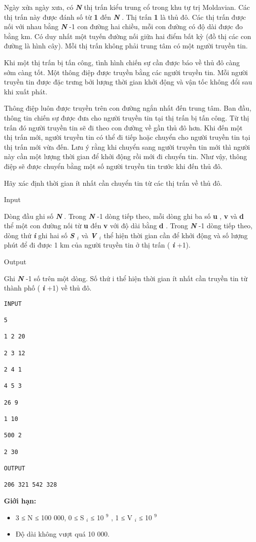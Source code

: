 

Ngày xửa ngày xưa, có \textbf{\emph{ N }} thị trấn kiểu trung cổ trong khu tự trị Moldavian. Các thị trấn này được đánh số từ \textbf{ 1 } đến \textbf{\emph{ N }} . Thị trấn \textbf{ 1 } là thủ đô. Các thị trấn được nối với nhau bằng \textbf{\emph{ N }} -1 con đường hai chiều, mỗi con đường có độ dài được đo bằng km. Có duy nhất một tuyến đường nối giữa hai điểm bất kỳ (đồ thị các con đường là hình cây). Mỗi thị trấn không phải trung tâm có một người truyền tin.

Khi một thị trấn bị tấn công, tình hình chiến sự cần được báo về thủ đô càng sớm càng tốt. Một thông điệp được truyền bằng các người truyền tin. Mỗi người truyền tin được đặc trưng bởi lượng thời gian khởi động và vận tốc không đổi sau khi xuất phát.

Thông điệp luôn được truyền trên con đường ngắn nhất đến trung tâm. Ban đầu, thông tin chiến sự được đưa cho người truyền tin tại thị trấn bị tấn công. Từ thị trấn đó người truyền tin sẽ đi theo con đường về gần thủ đô hơn. Khi đến một thị trấn mới, người truyền tin có thể đi tiếp hoặc chuyển cho người truyền tin tại thị trấn mới vừa đến. Lưu ý rằng khi chuyển sang người truyền tin mới thì người này cần một lượng thời gian để khởi động rồi mới đi chuyển tin. Như vậy, thông điệp sẽ được chuyển bằng một số người truyền tin trước khi đến thủ đô.

Hãy xác định thời gian ít nhất cần chuyển tin từ các thị trấn về thủ đô.

Input

Dòng đầu ghi số \textbf{\emph{ N }} . Trong \textbf{\emph{ N }} -1 dòng tiếp theo, mỗi dòng ghi ba số \textbf{ u } , \textbf{ v } và \textbf{ d } thể một con đường nối từ \textbf{ u } đến \textbf{ v } với độ dài bằng \textbf{ d } . Trong \textbf{\emph{ N }} -1 dòng tiếp theo, dòng thứ \textbf{\emph{ i }} ghi hai số \textbf{\emph{ S $_ i $}} và \textbf{\emph{ V $_ i $}} thể hiện thời gian cần để khởi động và số lượng phút để đi được 1 km của người truyền tin ở thị trấn ( \textbf{\emph{ i }} +1).

Output

Ghi \textbf{\emph{ N }} -1 số trên một dòng. Số thứ i thể hiện thời gian ít nhất cần truyền tin từ thành phố ( \textbf{\emph{ i }} +1) về thủ đô.
\begin{verbatim}
INPUT

5

1 2 20

2 3 12

2 4 1

4 5 3

26 9

1 10

500 2

2 30

OUTPUT

206 321 542 328\end{verbatim}

\textbf{Giới hạn:}
\begin{itemize}
	\item 3 ≤ N ≤ 100 000, 0 ≤ S $_ i $ ≤ 10 $^ 9 $ , 1 ≤ V $_ i $ ≤ 10 $^ 9 $
	\item Độ dài không vượt quá 10 000.
\end{itemize}